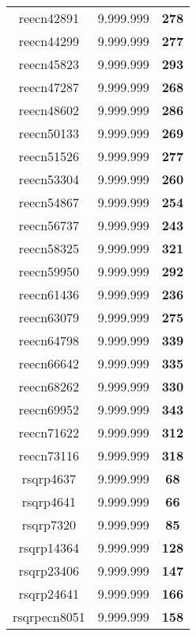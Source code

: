 \begin{tabular}{cc||c}
reecn42891       & 9.999.999        & {\bf 278}       \\ 
reecn44299       & 9.999.999        & {\bf 277}       \\ 
reecn45823       & 9.999.999        & {\bf 293}       \\ 
reecn47287       & 9.999.999        & {\bf 268}       \\ 
reecn48602       & 9.999.999        & {\bf 286}       \\ 
reecn50133       & 9.999.999        & {\bf 269}       \\ 
reecn51526       & 9.999.999        & {\bf 277}       \\ 
reecn53304       & 9.999.999        & {\bf 260}       \\ 
reecn54867       & 9.999.999        & {\bf 254}       \\ 
reecn56737       & 9.999.999        & {\bf 243}       \\ 
reecn58325       & 9.999.999        & {\bf 321}       \\ 
reecn59950       & 9.999.999        & {\bf 292}       \\ 
reecn61436       & 9.999.999        & {\bf 236}       \\ 
reecn63079       & 9.999.999        & {\bf 275}       \\ 
reecn64798       & 9.999.999        & {\bf 339}       \\ 
reecn66642       & 9.999.999        & {\bf 335}       \\ 
reecn68262       & 9.999.999        & {\bf 330}       \\ 
reecn69952       & 9.999.999        & {\bf 343}       \\ 
reecn71622       & 9.999.999        & {\bf 312}       \\ 
reecn73116       & 9.999.999        & {\bf 318}       \\ 
rsqrp4637        & 9.999.999        & {\bf 68}        \\ 
rsqrp4641        & 9.999.999        & {\bf 66}        \\ 
rsqrp7320        & 9.999.999        & {\bf 85}        \\ 
rsqrp14364       & 9.999.999        & {\bf 128}       \\ 
rsqrp23406       & 9.999.999        & {\bf 147}       \\ 
rsqrp24641       & 9.999.999        & {\bf 166}       \\ 
rsqrpecn8051     & 9.999.999        & {\bf 158}       \\ 

\end{tabular}
